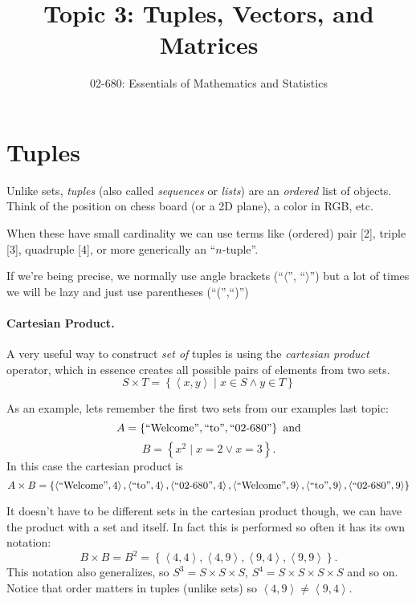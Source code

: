 \documentclass[11pt, oneside]{article}   	%
\title{Topic 3: Tuples, Vectors, and Matrices}
\author{02-680: Essentials of Mathematics and Statistics}
\begin{document}
\maketitle

\section{Tuples}
Unlike sets, \emph{tuples} (also called \emph{sequences} or \emph{lists}) are an \textit{ordered} list of objects.
Think of the position on chess board (or a 2D plane), a color in RGB, etc. 

When these have small cardinality we can use terms like (ordered) pair [2], triple [3], quadruple [4], or more generically an ``$n$-tuple''.

If we're being precise, we normally use angle brackets (``$\langle$'', ``$\rangle$'') but a lot of times we will be lazy and just use parentheses (``('',``)'')

\paragraph{Cartesian Product.}
A very useful way to construct \emph{set of} tuples is using the \emph{cartesian product} operator, 
which in essence creates all possible pairs of elements from two sets.
\[
S \times T = \left\{\left\langle x,y\right\rangle \mid x \in S \wedge y\in T\right\}
\]

As an example, lets remember the first two sets from our examples last topic: 
\[
A = \left\{\textnormal{``Welcome''}, \textnormal{``to''}, \textnormal{``02-680''}\right\} \textnormal{ and}
\]\[
B = \left\{x^2 \mid x=2 \vee x=3 \right\}.
\]
In this case the cartesian product is 
\[
A \times B = \left\{ \left\langle\textnormal{``Welcome''},4\right\rangle, \left\langle\textnormal{``to''},4\right\rangle, \left\langle\textnormal{``02-680''},4\right\rangle,
 \left\langle\textnormal{``Welcome''},9\right\rangle, \left\langle\textnormal{``to''},9\right\rangle, \left\langle\textnormal{``02-680''},9\right\rangle \right\}
\]

It doesn't have to be different sets in the cartesian product though, we can have the product with a set and itself.
In fact this is performed so often it has its own notation:
\[
B \times B = B^2 = \left\{ \left\langle 4,4 \right\rangle, \left\langle 4,9 \right\rangle,  \left\langle 9,4 \right\rangle, \left\langle 9,9 \right\rangle \right\}.
\]
This notation also generalizes, so $S^3 = S \times S \times S$, $S^4 = S\times S\times S\times S$ and so on. 
Notice that order matters in tuples (unlike sets) so $ \left\langle 4,9 \right\rangle \neq \left\langle 9,4 \right\rangle$.
\end{document}

